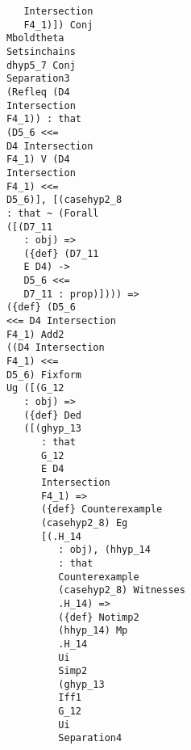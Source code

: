 \documentclass[12pt]{article}
\begin{document}
\begin{verbatim}
                                  Intersection 
                                  F4_1)]) Conj 
                               Mboldtheta 
                               Setsinchains 
                               dhyp5_7 Conj 
                               Separation3 
                               (Refleq (D4 
                               Intersection 
                               F4_1)) : that 
                               (D5_6 <<= 
                               D4 Intersection 
                               F4_1) V (D4 
                               Intersection 
                               F4_1) <<= 
                               D5_6)], [(casehyp2_8 
                               : that ~ (Forall 
                               ([(D7_11 
                                  : obj) => 
                                  ({def} (D7_11 
                                  E D4) -> 
                                  D5_6 <<= 
                                  D7_11 : prop)]))) => 
                               ({def} (D5_6 
                               <<= D4 Intersection 
                               F4_1) Add2 
                               ((D4 Intersection 
                               F4_1) <<= 
                               D5_6) Fixform 
                               Ug ([(G_12 
                                  : obj) => 
                                  ({def} Ded 
                                  ([(ghyp_13 
                                     : that 
                                     G_12 
                                     E D4 
                                     Intersection 
                                     F4_1) => 
                                     ({def} Counterexample 
                                     (casehyp2_8) Eg 
                                     [(.H_14 
                                        : obj), (hhyp_14 
                                        : that 
                                        Counterexample 
                                        (casehyp2_8) Witnesses 
                                        .H_14) => 
                                        ({def} Notimp2 
                                        (hhyp_14) Mp 
                                        .H_14 
                                        Ui 
                                        Simp2 
                                        (ghyp_13 
                                        Iff1 
                                        G_12 
                                        Ui 
                                        Separation4 

\end{verbatim}
\end{document}
